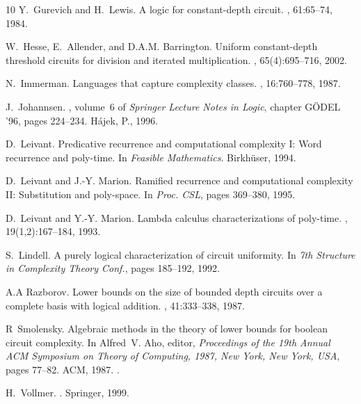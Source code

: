 \documentclass[11pt, oneside]{article}
\theoremstyle{definition}
\begin{document}
\begin{thebibliography}{10}
Y.~Gurevich and H.~Lewis.
\newblock A logic for constant-depth circuit.
, 61:65--74, 1984.

W.~Hesse, E.~Allender, and D.A.M. Barrington.
\newblock Uniform constant-depth threshold circuits for division and iterated
  multiplication.
, 65(4):695--716, 2002.

N.~Immerman.
\newblock Languages that capture complexity classes.
, 16:760--778, 1987.

J.~Johannsen.
, volume~6 of {\em Springer Lecture Notes in Logic}, chapter G\"ODEL
  '96, pages 224--234.
\newblock H\'ajek, P., 1996.

D.~Leivant.
\newblock Predicative recurrence and computational complexity {I}: Word
  recurrence and poly-time.
\newblock In {\em Feasible Mathematics}. Birkh\"user, 1994.

D.~Leivant and J.-Y. Marion.
\newblock Ramified recurrence and computational complexity {II}: Substitution
  and poly-space.
\newblock In {\em Proc. CSL}, pages 369--380, 1995.

D.~Leivant and Y.-Y. Marion.
\newblock Lambda calculus characterizations of poly-time.
, 19(1,2):167--184, 1993.

S.~Lindell.
\newblock A purely logical characterization of circuit uniformity.
\newblock In {\em 7th Structure in Complexity Theory Conf.}, pages 185--192,
  1992.

A.A Razborov.
\newblock Lower bounds on the size of bounded depth circuits over a complete
  basis with logical addition.
,
  41:333--338, 1987.

R~Smolensky.
\newblock Algebraic methods in the theory of lower bounds for boolean circuit
  complexity.
\newblock In Alfred~V. Aho, editor, {\em Proceedings of the 19th Annual {ACM}
  Symposium on Theory of Computing, 1987, New York, New York, {USA}}, pages
  77--82. {ACM}, 1987.
\newblock \href {https://doi.org/10.1145/28395.28404}
  {}.

H.~Vollmer.
.
\newblock Springer, 1999.

\end{thebibliography}
\end{document}

